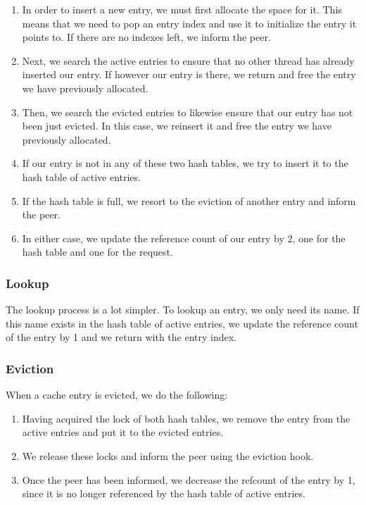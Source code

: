 \begin{enumerate}
	\item In order to insert a new entry, we must first allocate the space 
		for it. This means that we need to pop an entry index and use 
		it to initialize the entry it points to. If there are no 
		indexes left, we inform the peer.
	\item Next, we search the active entries to ensure that no other thread 
		has already inserted our entry. If however our entry is there, 
		we return and free the entry we have previously allocated.
	\item Then, we search the evicted entries to likewise ensure that our entry 
		has not been just evicted. In this case, we reinsert it and free the 
		entry we have previously allocated.
	\item If our entry is not in any of these two hash tables, we try to insert 
		it to the hash table of active entries.
	\item If the hash table is full, we resort to the eviction of another 
		entry and inform the peer.
	\item In either case, we update the reference count of our entry by 2, 
		one for the hash table and one for the request.
\end{enumerate}

\subsubsection{Lookup}

The lookup process is a lot simpler. To lookup an entry, we only need its name.  
If this name exists in the hash table of active entries, we update the 
reference count of the entry by 1 and we return with the entry index.

\subsubsection{Eviction}

When a cache entry is evicted, we do the following:

\begin{enumerate}
	\item Having acquired the lock of both hash tables, we remove the entry 
		from the active entries and put it to the evicted entries.
	\item We release these locks and inform the peer using the eviction hook.
	\item Once the peer has been informed, we decrease the refcount of the
		entry by 1, since it is no longer referenced by the hash table of 
		active entries.
\end{enumerate}

